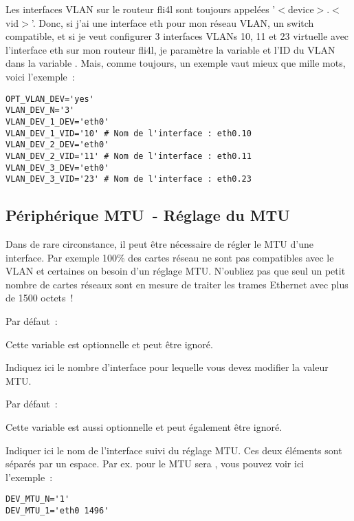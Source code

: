 Les interfaces VLAN sur le routeur fli4l sont toujours appelées '$<$device$>$.$<$vid$>$'.
Donc, si j'ai une interface eth pour mon réseau VLAN, un switch compatible, et si je
veut configurer 3 interfaces VLANs 10, 11 et 23 virtuelle avec l'interface eth sur
mon routeur fli4l, je paramètre la variable  et l'ID du
VLAN dans la variable . Mais, comme toujours, un exemple vaut
mieux que mille mots, voici l'exemple~:

\begin{example}
\begin{verbatim}
OPT_VLAN_DEV='yes'
VLAN_DEV_N='3'
VLAN_DEV_1_DEV='eth0'
VLAN_DEV_1_VID='10'	# Nom de l'interface : eth0.10
VLAN_DEV_2_DEV='eth0'
VLAN_DEV_2_VID='11'	# Nom de l'interface : eth0.11
VLAN_DEV_3_DEV='eth0'
VLAN_DEV_3_VID='23'	# Nom de l'interface : eth0.23
\end{verbatim}
\end{example}


{
\subsection {Périphérique MTU~- Réglage du MTU}
}

Dans de rare circonstance, il peut être nécessaire de régler le MTU d'une interface.
Par exemple 100\% des cartes réseau ne sont pas compatibles avec le VLAN et certaines
on besoin d'un réglage MTU. N'oubliez pas que seul un petit nombre de cartes réseaux
sont en mesure de traiter les trames Ethernet avec plus de 1500 octets~!

\begin{description}


  Par défaut~: 

  Cette variable est optionnelle et peut être ignoré.

  Indiquez ici le nombre d'interface pour lequelle vous devez modifier la valeur MTU.


  Par défaut~: 

  Cette variable est aussi optionnelle et peut également être ignoré.

  Indiquer ici le nom de l'interface suivi du réglage MTU. Ces deux éléments sont
  séparés par un espace.  Par ex. pour  le MTU sera ,
  vous pouvez voir ici l'exemple~:

\begin{example}
\begin{verbatim}
DEV_MTU_N='1'
DEV_MTU_1='eth0 1496'
\end{verbatim}
\end{example}

\end{description}

